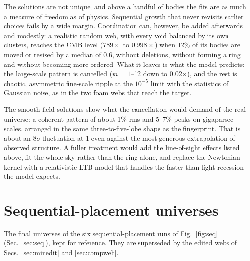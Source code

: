 \documentclass[aps,prd,twocolumn,nofootinbib,superscriptaddress,floatfix]{revtex4-2}
\newcommand{\fl}{\ensuremath{\times}}
\begin{document}
The solutions are not unique, and above a handful of bodies the fits are as much a measure of freedom as of physics. Sequential growth that never revisits earlier choices fails by a wide margin. Coordination can, however, be added afterwards and modestly: a realistic random web, with every void balanced by its own clusters, reaches the CMB level ($789\times$ to $0.998\times$) when 12\% of its bodies are moved or resized by a median of \SI{0.6}{\Gpc}, without deletions, without forming a ring and without becoming more ordered. What it leaves is what the model predicts: the large-scale pattern is cancelled ($m=1$--12 down to 0.02\fl), and the rest is chaotic, asymmetric fine-scale ripple at the $10^{-5}$ limit with the statistics of Gaussian noise, as in the two foam webs that reach the target.

The smooth-field solutions show what the cancellation would demand of the real universe: a coherent pattern of about 1\% rms and 5--7\% peaks on gigaparsec scales, arranged in the same three-to-five-lobe shape as the fingerprint. That is about an $8\sigma$ fluctuation at \SI{1}{\Gpc} even against the most generous extrapolation of observed structure. A fuller treatment would add the line-of-sight effects listed above, fit the whole sky rather than the ring alone, and replace the Newtonian kernel with a relativistic LTB model that handles the faster-than-light recession the model expects.

\clearpage


\clearpage
\onecolumngrid
\appendix
\section{Sequential-placement universes}\label{app:seq}
The final universes of the six sequential-placement runs of Fig.~\ref{fig:seq} (Sec.~\ref{sec:seq}), kept for reference. They are superseded by the edited webs of Secs.~\ref{sec:minedit} and \ref{sec:compweb}.
\end{document}
